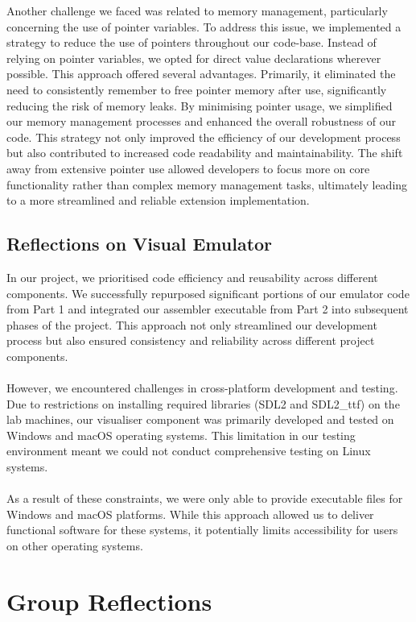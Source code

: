 \documentclass[10pt]{article}
\begin{document}
Another challenge we faced was related to memory management, particularly concerning the use of pointer variables. To address this issue, we implemented a strategy to reduce the use of pointers throughout our code-base. Instead of relying on pointer variables, we opted for direct value declarations wherever possible. This approach offered several advantages. Primarily, it eliminated the need to consistently remember to free pointer memory after use, significantly reducing the risk of memory leaks. By minimising pointer usage, we simplified our memory management processes and enhanced the overall robustness of our code. This strategy not only improved the efficiency of our development process but also contributed to increased code readability and maintainability. The shift away from extensive pointer use allowed developers to focus more on core functionality rather than complex memory management tasks, ultimately leading to a more streamlined and reliable extension implementation.

\subsection{Reflections on Visual Emulator}
In our project, we prioritised code efficiency and reusability across different components. We successfully repurposed significant portions of our emulator code from Part 1 and integrated our assembler executable from Part 2 into subsequent phases of the project. This approach not only streamlined our development process but also ensured consistency and reliability across different project components.\\
\\
However, we encountered challenges in cross-platform development and testing. Due to restrictions on installing required libraries (SDL2 and SDL2\_ttf) on the lab machines, our visualiser component was primarily developed and tested on Windows and macOS operating systems. This limitation in our testing environment meant we could not conduct comprehensive testing on Linux systems. \\
\\
As a result of these constraints, we were only able to provide executable files for Windows and macOS platforms. While this approach allowed us to deliver functional software for these systems, it potentially limits accessibility for users on other operating systems.

\section{Group Reflections}
\end{document}
